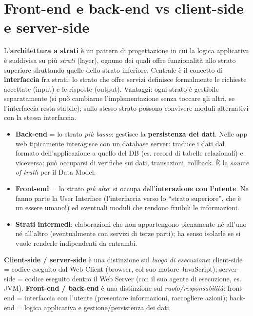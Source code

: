 \section{Front-end e back-end vs client-side e server-side}

\begin{definizione}
L'\textbf{architettura a strati} \`e un pattern di progettazione in cui la logica applicativa
\`e suddivisa su pi\`u \emph{strati} (layer), ognuno dei quali offre funzionalit\`a allo strato
superiore sfruttando quelle dello strato inferiore. Centrale \`e il concetto di
\textbf{interfaccia} fra strati: lo strato che offre servizi definisce formalmente le richieste
accettate (input) e le risposte (output). Vantaggi: ogni strato \`e gestibile separatamente
(si pu\`o cambiarne l'implementazione senza toccare gli altri, se l'interfaccia resta stabile);
sullo stesso strato possono convivere moduli alternativi con la stessa interfaccia.
\end{definizione}

\begin{itemize}
  \item \textbf{Back-end} = lo strato \emph{pi\`u basso}: gestisce la \textbf{persistenza dei
        dati}. Nelle app web tipicamente interagisce con un database server: traduce i dati
        dal formato dell'applicazione a quello del DB (es. record di tabelle relazionali) e
        viceversa; pu\`o occuparsi di verifiche sui dati, transazioni, rollback. \`E la
        \emph{source of truth} per il Data Model.
  \item \textbf{Front-end} = lo strato \emph{pi\`u alto}: si occupa dell'\textbf{interazione
        con l'utente}. Ne fanno parte la User Interface (l'interfaccia verso lo ``strato
        superiore'', che \`e un essere umano!) ed eventuali moduli che rendono fruibili le
        informazioni.
  \item \textbf{Strati intermedi}: elaborazioni che non appartengono pienamente n\'e all'uno
        n\'e all'altro (eventualmente con servizi di terze parti); ha senso isolarle se si
        vuole renderle indipendenti da entrambi.
\end{itemize}

\begin{importante}
\textbf{Client-side / server-side} \`e una distinzione sul \emph{luogo di esecuzione}:
client-side = codice eseguito dal Web Client (browser, col suo motore JavaScript);
server-side = codice eseguito dentro il Web Server (con il suo agente di esecuzione, es. JVM).
\textbf{Front-end / back-end} \`e una distinzione sul \emph{ruolo/responsabilit\`a}:
front-end = interfaccia con l'utente (presentare informazioni, raccogliere azioni);
back-end = logica applicativa e gestione/persistenza dei dati.
\end{importante}

